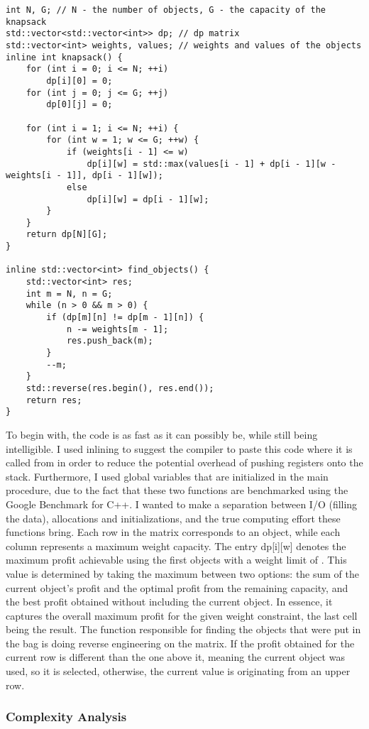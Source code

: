 \documentclass[runningheads]{llncs}
\begin{document}
\begin{lstlisting}
int N, G; // N - the number of objects, G - the capacity of the knapsack
std::vector<std::vector<int>> dp; // dp matrix
std::vector<int> weights, values; // weights and values of the objects
inline int knapsack() {
	for (int i = 0; i <= N; ++i)
		dp[i][0] = 0;
	for (int j = 0; j <= G; ++j)
		dp[0][j] = 0;

	for (int i = 1; i <= N; ++i) {
		for (int w = 1; w <= G; ++w) {
			if (weights[i - 1] <= w)
				dp[i][w] = std::max(values[i - 1] + dp[i - 1][w - weights[i - 1]], dp[i - 1][w]);
			else
				dp[i][w] = dp[i - 1][w];
		}
	}
	return dp[N][G];
}

inline std::vector<int> find_objects() {
	std::vector<int> res;
	int m = N, n = G;
	while (n > 0 && m > 0) {
		if (dp[m][n] != dp[m - 1][n]) {
			n -= weights[m - 1];
			res.push_back(m);
		}
		--m;
	}
	std::reverse(res.begin(), res.end());
	return res;
}
\end{lstlisting}
To begin with, the code is as fast as it can possibly be, while still being intelligible. I used inlining to suggest the compiler to paste this code where it is called from in order to reduce the potential overhead of pushing registers onto the stack. Furthermore, I used global variables that are initialized in the main procedure, due to the fact that these two functions are benchmarked using the Google Benchmark for C++. I wanted to make a separation between I/O (filling the data), allocations and initializations, and the true computing effort these functions bring.
Each row in the matrix corresponds to an object, while each column represents a maximum weight capacity. The entry dp[i][w] denotes the maximum profit achievable using the first  objects with a weight limit of . This value is determined by taking the maximum between two options: the sum of the current object's profit and the optimal profit from the remaining capacity, and the best profit obtained without including the current object. In essence, it captures the overall maximum profit for the given weight constraint, the last cell being the result. The function responsible for finding the objects that were put in the bag is doing reverse engineering on the matrix. If the profit obtained for the current row is different than the one above it, meaning the current object was used, so it is selected, otherwise, the current value is originating from an upper row.


\subsubsection{Complexity Analysis}
\end{document}
